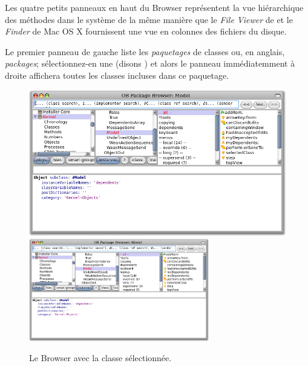 \documentclass[a4paper,10pt,twoside]{book}
\begin{document}
Les quatre petits panneaux en haut du Browser représentent la vue
hiérarchique des méthodes dans le système de la même
manière que le \textit{File Viewer} de  et le
\textit{Finder} de Mac OS X fournissent une vue en colonnes 
des fichiers du disque.

Le premier panneau de gauche liste les \emph{paquetages} de
classes ou, en anglais, \emph{packages};
sélectionnez-en une (disons ) et alors le
panneau immédiatemment à droite affichera toutes les classes incluses
dans ce paquetage. %

\begin{figure}[htbp]
   \centering
   \ifluluelse
	   {\includegraphics[width=\textwidth]{SystemBrowser1} }
	   {\includegraphics[width=0.7\textwidth]{SystemBrowser1} }
   \caption{Le Browser avec la classe  sélectionnée.}
\end{figure}
\end{document}
